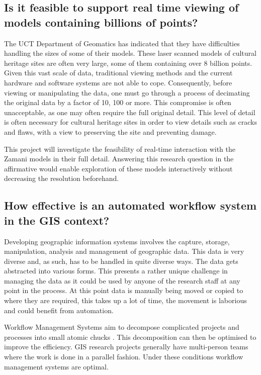 \documentclass[12pt,a4paper]{article}
\begin{document}
\subsection{Is it feasible to support real time viewing of models containing billions of points?}
The UCT Department of Geomatics has indicated that they have difficulties
handling the sizes of some of their models. These laser scanned models of
cultural heritage sites are often very large, some of them containing over
8 billion points. Given this vast scale of data, traditional viewing methods
and the current hardware and software systems are not able to cope.
Consequently, before viewing or manipulating the data, one must go through
a process of decimating the original data by a factor of 10, 100 or more.
This compromise is often unacceptable, as one may often require the full
original detail. This level of detail is often necessary for cultural heritage
sites in order to view details such as cracks and flaws, with a view to
preserving the site and preventing damage.

This project will investigate the feasibility of real-time interaction with the Zamani models in their full detail. Answering this research question in the affirmative would enable exploration of these models interactively without decreasing the resolution beforehand.
\subsection{How effective is an automated workflow system in the GIS context?}
Developing geographic information systems involves the capture, storage, manipulation, analysis
and management of geographic data. This data is very diverse and, as such, has to be handled
in quite diverse ways. The data gets abstracted into various forms. This presents a
rather unique challenge in managing the data as it could be used by anyone of the research
staff at any point in the process. At this point data is manually being moved or copied to
where they are required, this takes up a lot of time, the movement is laborious and could benefit
from automation.

Workflow Management Systems aim to decompose complicated projects and processes into
small atomic chucks \cite{Taylor:2006:WES:1196459}. This decomposition can then be
optimised to improve the efficiency.
GIS research projects generally have multi-person teams where the work is
done in a parallel fashion. Under these conditions workflow management systems
are optimal.
\end{document}
